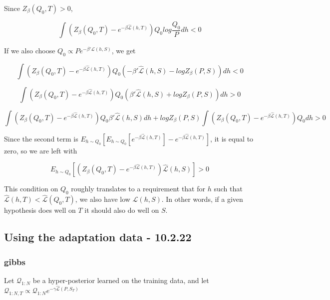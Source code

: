 \documentclass[letterpaper]{article}
\theoremstyle{definition}
\begin{document}
Since $Z_{\beta}(Q_0,T)>0$,

$$\int \left (Z_{\beta}(Q_0,T)-e^{-\beta\hat{\mathcal{L}}(h,T)}\right )Q_0log\frac{Q_0}{P}dh<0$$

If we also choose $Q_0\propto P e^{-\beta' \hat{\mathcal{L}}(h,S)}$, we get

$$\int \left (Z_{\beta}(Q_0,T)-e^{-\beta\hat{\mathcal{L}}(h,T)}\right )Q_0\left (-\beta'\hat{\mathcal{L}}(h,S)-logZ_{\beta}(P,S)\right )dh<0$$

$$\int \left (Z_{\beta}(Q_0,T)-e^{-\beta\hat{\mathcal{L}}(h,T)}\right )Q_0\left (\beta'\hat{\mathcal{L}}(h,S)+logZ_{\beta}(P,S)\right )dh>0$$

$$\int \left (Z_{\beta}(Q_0,T)-e^{-\beta\hat{\mathcal{L}}(h,T)}\right )Q_0 \beta'\hat{\mathcal{L}}(h,S)dh+logZ_{\beta}(P,S)\int \left (Z_{\beta}(Q_0,T)-e^{-\beta\hat{\mathcal{L}}(h,T)}\right )Q_0dh>0$$

Since the second term is $E_{h\sim Q_0}[E_{h\sim Q_0}[e^{-\beta\hat{\mathcal{L}}(h,T)}]-e^{-\beta\hat{\mathcal{L}}(h,T)}]$, it is equal to zero, so we are left with

$$E_{h\sim Q_0}\left [\left (Z_{\beta}(Q_0,T)-e^{-\beta\hat{\mathcal{L}}(h,T)}\right ) \hat{\mathcal{L}}(h,S)\right ]>0$$

This condition on $Q_0$ roughly translates to a requirement that for $h$ such that $\hat{\mathcal{L}}(h,T)<\hat{\mathcal{L}}(Q_0,T)$, we also have low $\hat{\mathcal{L}}(h,S)$.
In other words, if a given hypothesis does well on $T$ it should also do well on $S$.

\subsection{Using the adaptation data - 10.2.22}

\subsubsection{gibbs}

Let $\mathcal{Q}_{1:N}$ be a hyper-posterior learned on the training data, and let $\mathcal{Q}_{1:N,T}\propto \mathcal{Q}_{1:N}e^{-\gamma\hat{\mathcal{L}}(P,S_T)}$


\end{document}
